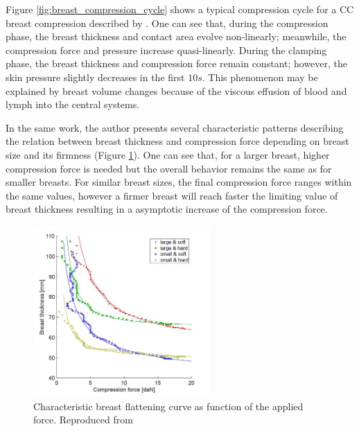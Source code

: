 Figure \ref{fig:breast_compression_cycle} shows a typical compression cycle for a CC breast compression described by \cite{de_pain_2015}. One can see that, during the compression phase, the breast thickness and contact area evolve non-linearly; meanwhile, the compression force and pressure increase quasi-linearly. During the clamping phase, the breast thickness and compression force remain constant; however, the skin pressure slightly decreases in the first $10s$. This phenomenon may be explained by breast volume changes because of the viscous effusion of blood and lymph into the central systems. 

In the same work, the author presents several characteristic patterns describing the relation between breast thickness and compression force depending on breast size and its firmness (Figure \ref{fig:thickness_force_patterns_groot}). One can see that, for a larger breast, higher compression force is needed but the overall behavior remains the same as for smaller breasts. For similar breast sizes, the final compression force ranges within the same values, however a firmer breast will reach faster the limiting value of breast thickness resulting in a asymptotic increase of the compression force.
\begin{figure}[!h]
\centering
\includegraphics[width=0.6\textwidth,keepaspectratio]{figures/thickness_force_patterns_groot.jpg} 
\caption{Characteristic breast flattening curve as function of the applied force. Reproduced from \cite{groot_towards_2015}}\label{fig:thickness_force_patterns_groot}
\end{figure}

